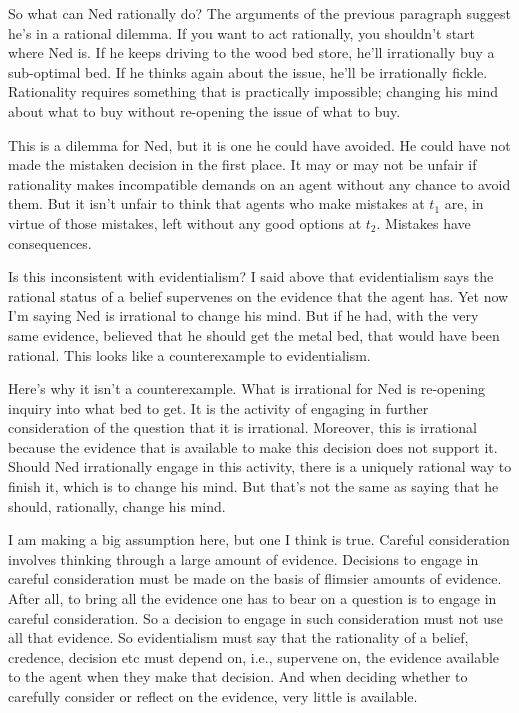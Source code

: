 So what can Ned rationally do? The arguments of the previous paragraph suggest he's in a rational dilemma. If you want to act rationally, you shouldn't start where Ned is. If he keeps driving to the wood bed store, he'll irrationally buy a sub-optimal bed. If he thinks again about the issue, he'll be irrationally fickle. Rationality requires something that is practically impossible; changing his mind about what to buy without re-opening the issue of what to buy.

This is a dilemma for Ned, but it is one he could have avoided. He could have not made the mistaken decision in the first place. It may or may not be unfair if rationality makes incompatible demands on an agent without any chance to avoid them. But it isn't unfair to think that agents who make mistakes at $t_1$ are, in virtue of those mistakes, left without any good options at $t_2$. Mistakes have consequences.

Is this inconsistent with evidentialism? I said above that evidentialism says the rational status of a belief supervenes on the evidence that the agent has. Yet now I'm saying Ned is irrational to change his mind. But if he had, with the very same evidence, believed that he should get the metal bed, that would have been rational. This looks like a counterexample to evidentialism.

Here's why it isn't a counterexample. What is irrational for Ned is re-opening inquiry into what bed to get. It is the activity of engaging in further consideration of the question that it is irrational. Moreover, this is irrational because the evidence that is available to make this decision does not support it. Should Ned irrationally engage in this activity, there is a uniquely rational way to finish it, which is to change his mind. But that's not the same as saying that he should, rationally, change his mind.

I am making a big assumption here, but one I think is true. Careful consideration involves thinking through a large amount of evidence. Decisions to engage in careful consideration must be made on the basis of flimsier amounts of evidence. After all, to bring all the evidence one has to bear on a question is to engage in careful consideration. So a decision to engage in such consideration must not use all that evidence. So evidentialism must say that the rationality of a belief, credence, decision etc must depend on, i.e., supervene on, the evidence available to the agent when they make that decision. And when deciding whether to carefully consider or reflect on the evidence, very little is available.

